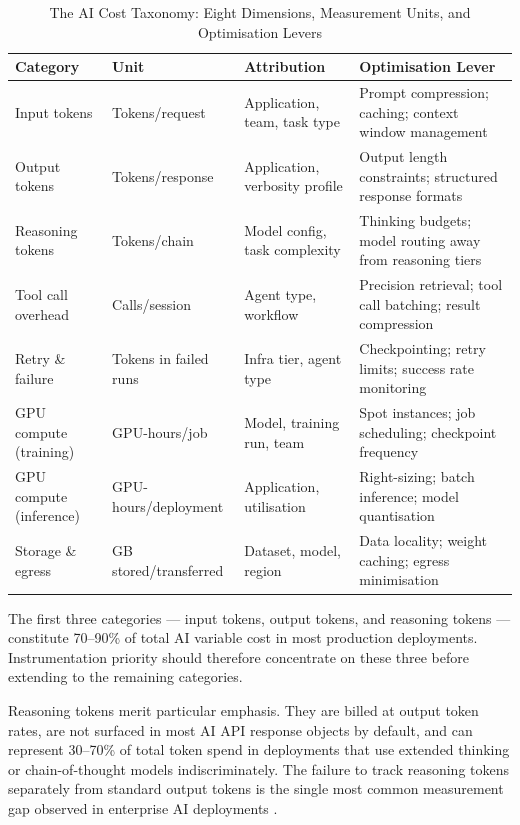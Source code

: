 \documentclass[11pt,twocolumn]{article}
\begin{document}
\begin{table}[t]
\centering
\caption{The AI Cost Taxonomy: Eight Dimensions, Measurement Units, and Optimisation Levers}
\label{tab:taxonomy}
\small
\begin{tabularx}{\textwidth}{L{2.0cm} L{1.8cm} L{2.5cm} L{4.8cm}}
\toprule
\textbf{Category} & \textbf{Unit} & \textbf{Attribution} & \textbf{Optimisation Lever} \\
\midrule
Input tokens      & Tokens/request  & Application, team, task type    & Prompt compression; caching; context window management \\
\addlinespace
Output tokens     & Tokens/response & Application, verbosity profile  & Output length constraints; structured response formats \\
\addlinespace
Reasoning tokens  & Tokens/chain    & Model config, task complexity   & Thinking budgets; model routing away from reasoning tiers \\
\addlinespace
Tool call overhead & Calls/session  & Agent type, workflow            & Precision retrieval; tool call batching; result compression \\
\addlinespace
Retry \& failure  & Tokens in failed runs & Infra tier, agent type   & Checkpointing; retry limits; success rate monitoring \\
\addlinespace
GPU compute (training) & GPU-hours/job & Model, training run, team    & Spot instances; job scheduling; checkpoint frequency \\
\addlinespace
GPU compute (inference) & GPU-hours/deployment & Application, utilisation & Right-sizing; batch inference; model quantisation \\
\addlinespace
Storage \& egress & GB stored/transferred & Dataset, model, region   & Data locality; weight caching; egress minimisation \\
\bottomrule
\end{tabularx}
\end{table}

The first three categories --- input tokens, output tokens, and reasoning tokens ---
constitute 70--90\% of total AI variable cost in most production deployments.
Instrumentation priority should therefore concentrate on these three before extending
to the remaining categories.

Reasoning tokens merit particular emphasis. They are billed at output token rates,
are not surfaced in most AI API response objects by default, and can represent
30--70\% of total token spend in deployments that use extended thinking or
chain-of-thought models indiscriminately. The failure to track reasoning tokens
separately from standard output tokens is the single most common measurement
gap observed in enterprise AI deployments \citep{anthropic2025extended}.
\end{document}
